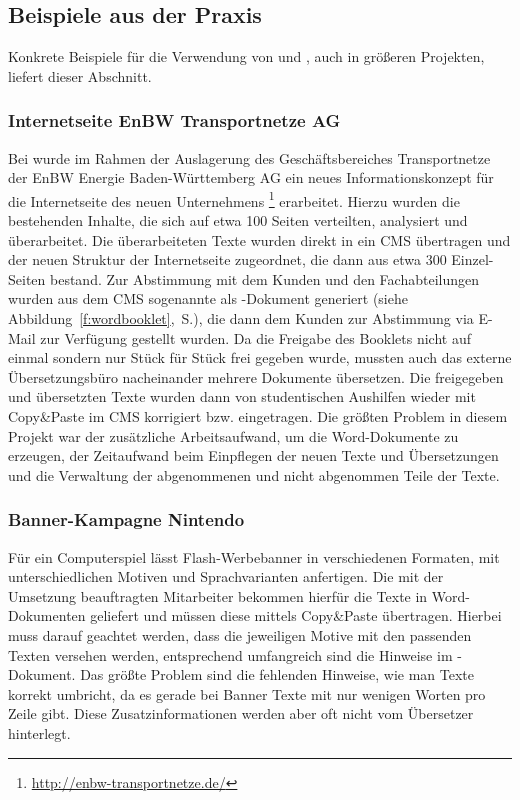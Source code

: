 \subsection{Beispiele aus der Praxis}\label{l:praxisbeispiele}

Konkrete Beispiele für die Verwendung von  und , auch in größeren Projekten, liefert dieser Abschnitt.

\subsubsection{Internetseite EnBW Transportnetze AG}

Bei  wurde im Rahmen der Auslagerung des Geschäftsbereiches Transportnetze der EnBW Energie Baden-Württemberg AG ein neues Informationskonzept für die Internetseite des neuen Unternehmens \footnote{\url{http://enbw-transportnetze.de/}} erarbeitet. Hierzu wurden die bestehenden Inhalte, die sich auf etwa 100 Seiten verteilten, analysiert und überarbeitet. Die überarbeiteten Texte wurden direkt in ein CMS übertragen und der neuen Struktur der Internetseite zugeordnet, die dann aus etwa 300 Einzel-Seiten bestand. Zur Abstimmung mit dem Kunden und den Fachabteilungen wurden aus dem CMS sogenannte  als -Dokument generiert (siehe Abbildung~\ref{f:wordbooklet},~S.\pageref{f:wordbooklet}), die dann dem Kunden zur Abstimmung via E-Mail zur Verfügung gestellt wurden. Da die Freigabe des Booklets nicht auf einmal sondern nur Stück für Stück frei gegeben wurde, mussten auch das externe Übersetzungsbüro nacheinander mehrere Dokumente übersetzen. Die freigegeben und übersetzten Texte wurden dann von studentischen Aushilfen wieder mit Copy\&Paste im CMS korrigiert bzw. eingetragen. Die größten Problem in diesem Projekt war der zusätzliche Arbeitsaufwand, um die Word-Dokumente zu erzeugen, der Zeitaufwand beim Einpflegen der neuen Texte und Übersetzungen und die Verwaltung der abgenommenen und nicht abgenommen Teile der Texte.

\subsubsection{Banner-Kampagne Nintendo}

Für ein Computerspiel lässt  Flash-Werbebanner in verschiedenen Formaten, mit unterschiedlichen Motiven und Sprachvarianten anfertigen. Die mit der Umsetzung beauftragten Mitarbeiter bekommen hierfür die Texte in Word-Dokumenten geliefert und müssen diese mittels Copy\&Paste übertragen. Hierbei muss darauf geachtet werden, dass die jeweiligen Motive mit den passenden Texten versehen werden, entsprechend umfangreich sind die Hinweise im -Dokument. Das größte Problem sind die fehlenden Hinweise, wie man Texte korrekt umbricht, da es gerade bei Banner Texte mit nur wenigen Worten pro Zeile gibt. Diese Zusatzinformationen werden aber oft nicht vom Übersetzer hinterlegt.

